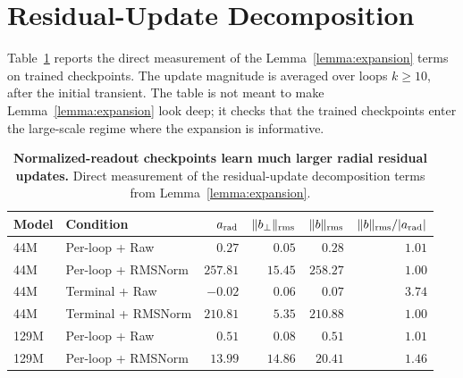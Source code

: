 \section{Residual-Update Decomposition}
\label{app:residual-update}

Table~\ref{tab:bounded-block-app} reports the direct measurement of the Lemma~\ref{lemma:expansion} terms on trained checkpoints.
The update magnitude is averaged over loops $k\geq10$, after the initial transient.
The table is not meant to make Lemma~\ref{lemma:expansion} look deep; it checks that the trained checkpoints enter the large-scale regime where the expansion is informative.

\begin{table}[h]
\centering
\small
\caption{\textbf{Normalized-readout checkpoints learn much larger radial residual updates.} Direct measurement of the residual-update decomposition terms from Lemma~\ref{lemma:expansion}.}
\label{tab:bounded-block-app}
\begin{tabular}{llrrrr}
\toprule
\textbf{Model} & \textbf{Condition} & $a_{\mathrm{rad}}$ & $\|b_\perp\|_{\mathrm{rms}}$ & $\|b\|_{\mathrm{rms}}$ & $\|b\|_{\mathrm{rms}}/|a_{\mathrm{rad}}|$ \\
\midrule
44M  & Per-loop + Raw     & $0.27$    & $0.05$  & $0.28$  & $1.01$ \\
44M  & Per-loop + RMSNorm & $257.81$  & $15.45$ & $258.27$ & $1.00$ \\
44M  & Terminal + Raw     & $-0.02$   & $0.06$  & $0.07$  & $3.74$ \\
44M  & Terminal + RMSNorm & $210.81$  & $5.35$  & $210.88$ & $1.00$ \\
129M & Per-loop + Raw     & $0.51$    & $0.08$  & $0.51$  & $1.01$ \\
129M & Per-loop + RMSNorm & $13.99$   & $14.86$ & $20.41$ & $1.46$ \\
\bottomrule
\end{tabular}
\end{table}
